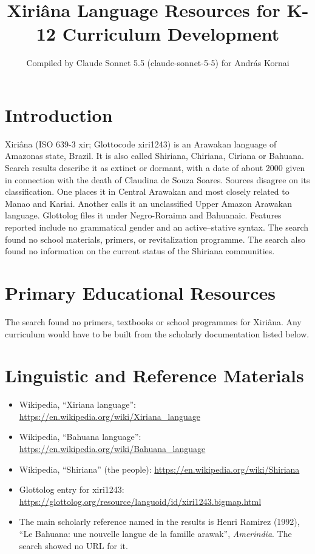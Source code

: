 \documentclass[12pt]{article}
\title{Xiri\^ana Language Resources for K-12 Curriculum Development}
\author{Compiled by Claude Sonnet 5.5 (claude-sonnet-5-5) for Andr\'as Kornai}
\date{}
\begin{document}
\maketitle

\section{Introduction}
Xiri\^ana (ISO 639-3 xir; Glottocode xiri1243) is an Arawakan language of Amazonas state, Brazil. It is also called Shiriana, Chiriana, Ciriana or Bahuana. Search results describe it as extinct or dormant, with a date of about 2000 given in connection with the death of Claudina de Souza Soares. Sources disagree on its classification. One places it in Central Arawakan and most closely related to Manao and Kariai. Another calls it an unclassified Upper Amazon Arawakan language. Glottolog files it under Negro-Roraima and Bahuanaic. Features reported include no grammatical gender and an active--stative syntax. The search found no school materials, primers, or revitalization programme. The search also found no information on the current status of the Shiriana communities.

\section{Primary Educational Resources}
The search found no primers, textbooks or school programmes for Xiri\^ana. Any curriculum would have to be built from the scholarly documentation listed below.

\section{Linguistic and Reference Materials}
\begin{itemize}
\item Wikipedia, ``Xiriana language'': \url{https://en.wikipedia.org/wiki/Xiriana_language}
\item Wikipedia, ``Bahuana language'': \url{https://en.wikipedia.org/wiki/Bahuana_language}
\item Wikipedia, ``Shiriana'' (the people): \url{https://en.wikipedia.org/wiki/Shiriana}
\item Glottolog entry for xiri1243: \url{https://glottolog.org/resource/languoid/id/xiri1243.bigmap.html}
\item The main scholarly reference named in the results is Henri Ramirez (1992), ``Le Bahuana: une nouvelle langue de la famille arawak'', \emph{Amerindia}. The search showed no URL for it.
\end{itemize}
\end{document}

